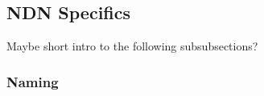 

\subsection{NDN Specifics}
Maybe short intro to the following subsubsections?

\subsubsection{Naming}

